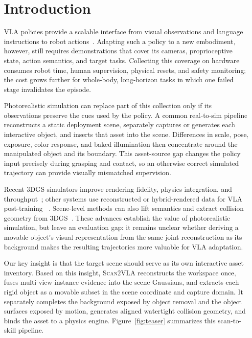 \documentclass[letterpaper,10pt,conference]{ieeeconf}
\newcommand{\system}{\textsc{Scan2VLA}}
\begin{document}
\section{Introduction}
\label{sec:introduction}

VLA policies provide a scalable interface from visual observations and language
instructions to robot actions~\cite{black2025pi05,shukor2025smolvla}. Adapting
such a policy to a new embodiment, however, still requires demonstrations that
cover its cameras, proprioceptive state, action semantics, and target tasks.
Collecting this coverage on hardware consumes robot time, human supervision,
physical resets, and safety monitoring; the cost grows further for whole-body,
long-horizon tasks in which one failed stage invalidates the episode.

Photorealistic simulation can replace part of this collection only if its
observations preserve the cues used by the policy. A common real-to-sim pipeline
reconstructs a static deployment scene, separately captures or generates each
interactive object, and inserts that asset into the scene. Differences in scale,
pose, exposure, color response, and baked illumination then concentrate around
the manipulated object and its boundary. This asset-source gap changes the
policy input precisely during grasping and contact, so an otherwise correct
simulated trajectory can provide visually mismatched supervision.

Recent 3DGS simulators improve rendering fidelity, physics integration, and
throughput~\cite{qureshi2025splatsim,jiang2025gsworld,jia2026gsplayground}; other
systems use reconstructed or hybrid-rendered data for VLA post-training
~\cite{gao2026mirage2matter,kim2026legs}. Scene-level methods can also lift
semantics and extract collision geometry from 3DGS~\cite{sun2026digitaltwin}.
These advances establish the value of photorealistic simulation, but leave an
evaluation gap: it remains unclear whether deriving a movable object's visual
representation from the same joint reconstruction as its background makes the
resulting trajectories more valuable for VLA adaptation.

Our key insight is that the target scene should serve as its own interactive
asset inventory. Based on this insight, \system{} reconstructs the workspace
once, fuses multi-view instance evidence into the scene Gaussians, and extracts
each rigid object as a movable subset in the scene coordinate and capture domain.
It separately completes the background exposed by object removal and the object
surfaces exposed by motion, generates aligned watertight collision geometry, and
binds the asset to a physics engine. Figure~\ref{fig:teaser} summarizes this
scan-to-skill pipeline.
\end{document}
